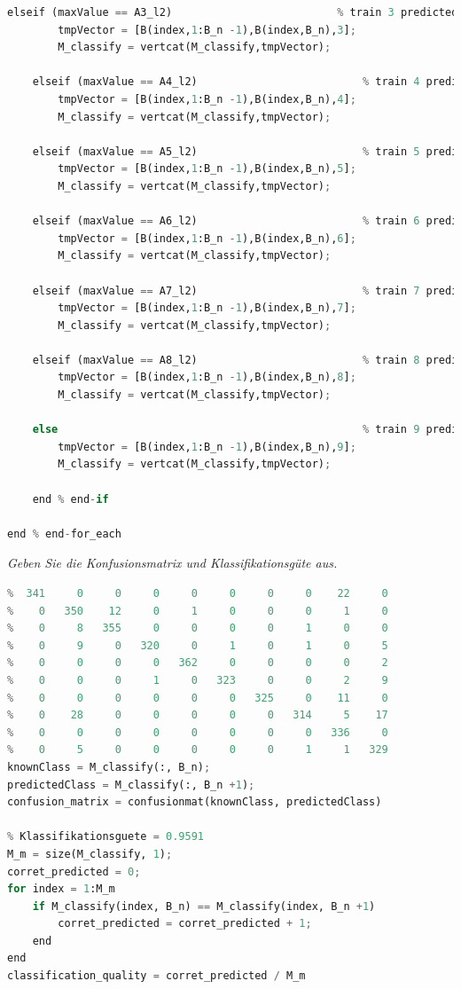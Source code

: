 \documentclass[12pt]{article}
\begin{document}
\begin{lstlisting}[language=Python]
    elseif (maxValue == A3_l2)                          % train 3 predicted
        tmpVector = [B(index,1:B_n -1),B(index,B_n),3];
        M_classify = vertcat(M_classify,tmpVector);

    elseif (maxValue == A4_l2)                          % train 4 predicted
        tmpVector = [B(index,1:B_n -1),B(index,B_n),4];
        M_classify = vertcat(M_classify,tmpVector);

    elseif (maxValue == A5_l2)                          % train 5 predicted
        tmpVector = [B(index,1:B_n -1),B(index,B_n),5];
        M_classify = vertcat(M_classify,tmpVector);

    elseif (maxValue == A6_l2)                          % train 6 predicted
        tmpVector = [B(index,1:B_n -1),B(index,B_n),6];
        M_classify = vertcat(M_classify,tmpVector);

    elseif (maxValue == A7_l2)                          % train 7 predicted
        tmpVector = [B(index,1:B_n -1),B(index,B_n),7];
        M_classify = vertcat(M_classify,tmpVector);
    
    elseif (maxValue == A8_l2)                          % train 8 predicted
        tmpVector = [B(index,1:B_n -1),B(index,B_n),8];
        M_classify = vertcat(M_classify,tmpVector);
    
    else                                                % train 9 predicted
        tmpVector = [B(index,1:B_n -1),B(index,B_n),9];
        M_classify = vertcat(M_classify,tmpVector);

    end % end-if

end % end-for_each
\end{lstlisting}
\newpage
\textit{Geben ​Sie die Konfusionsmatrix und Klassifikationsgüte aus​.}
\begin{lstlisting}[language=Python]
% Konfusionsmatrix (Rows: actual classes, Columns: predicted classes)
%  341     0     0     0     0     0     0     0    22     0
%    0   350    12     0     1     0     0     0     1     0
%    0     8   355     0     0     0     0     1     0     0
%    0     9     0   320     0     1     0     1     0     5
%    0     0     0     0   362     0     0     0     0     2
%    0     0     0     1     0   323     0     0     2     9
%    0     0     0     0     0     0   325     0    11     0
%    0    28     0     0     0     0     0   314     5    17
%    0     0     0     0     0     0     0     0   336     0
%    0     5     0     0     0     0     0     1     1   329
knownClass = M_classify(:, B_n);
predictedClass = M_classify(:, B_n +1);
confusion_matrix = confusionmat(knownClass, predictedClass)

% Klassifikationsguete = 0.9591
M_m = size(M_classify, 1);
corret_predicted = 0;
for index = 1:M_m
    if M_classify(index, B_n) == M_classify(index, B_n +1)
        corret_predicted = corret_predicted + 1;
    end
end
classification_quality = corret_predicted / M_m
\end{lstlisting}
\newpage
\end{document}
